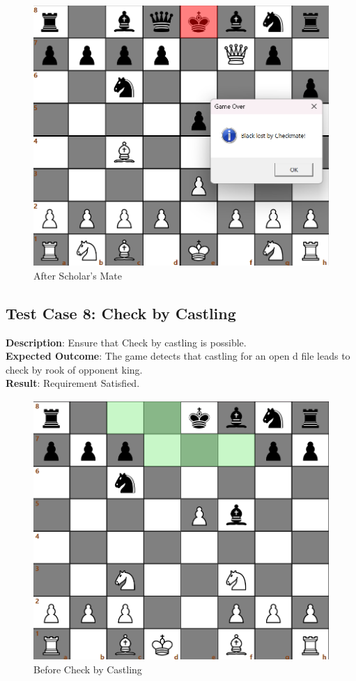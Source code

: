 \documentclass[a4paper,12pt]{article}
\begin{document}
\begin{figure}[H]
    \centering
    \includegraphics[width=0.6\linewidth]{Images/Test Cases/testCase7Img2.png}
    \caption{After Scholar's Mate}
    \label{fig:AfterScholarsMate}
\end{figure}

\subsection{Test Case 8: Check by Castling}
\textbf{Description}: Ensure that Check by castling is possible.\\
\textbf{Expected Outcome}: The game detects that castling for an open d file leads to check by rook of opponent king.\\
\textbf{Result}: Requirement Satisfied.

\begin{figure}[H]
    \centering
    \includegraphics[width=0.6\linewidth]{Images/Test Cases/testCase8Img1.png}
    \caption{Before Check by Castling}
    \label{fig:BeforeCheckByCastling}
\end{figure}
\end{document}
